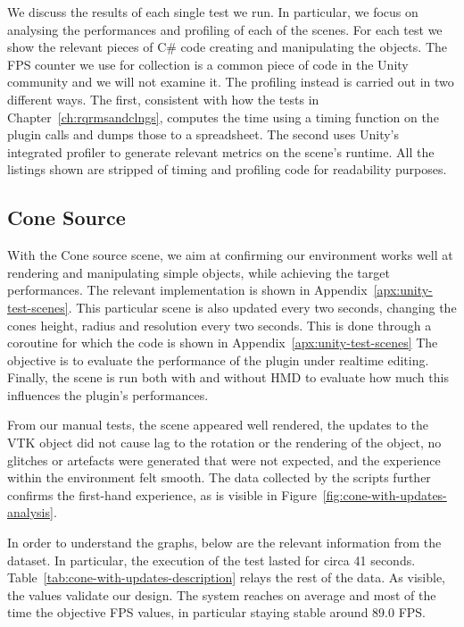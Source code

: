 We discuss the results of each single test we run. In particular, we focus on analysing the performances and profiling of each of the scenes. For each test we show the relevant pieces of C\# code creating and manipulating the objects. The FPS counter we use for collection is a common piece of code in the Unity community and we will not examine it. The profiling instead is carried out in two different ways. The first, consistent with how the tests in Chapter~\ref{ch:rqrmsandclngs}, computes the time using a timing function on the plugin calls and dumps those to a spreadsheet. The second uses Unity's integrated profiler to generate relevant metrics on the scene's runtime. All the listings shown are stripped of timing and profiling code for readability purposes.

\subsection{Cone Source}

With the Cone source scene, we aim at confirming our environment works well at rendering and manipulating simple objects, while achieving the target performances. The relevant implementation is shown in Appendix~\ref{apx:unity-test-scenes}. This particular scene is also updated every two seconds, changing the cones height, radius and resolution every two seconds. This is done through a coroutine for which the code is shown in Appendix~\ref{apx:unity-test-scenes} The objective is to evaluate the performance of the plugin under realtime editing. Finally, the scene is run both with and without HMD to evaluate how much this influences the plugin's performances.

From our manual tests, the scene appeared well rendered, the updates to the VTK object did not cause lag to the rotation or the rendering of the object, no glitches or artefacts were generated that were not expected, and the experience within the environment felt smooth. The data collected by the scripts further confirms the first-hand experience, as is visible in Figure~\ref{fig:cone-with-updates-analysis}.

In order to understand the graphs, below are the relevant information from the dataset. In particular, the execution of the test lasted for circa 41 seconds. Table~\ref{tab:cone-with-updates-description} relays the rest of the data. As visible, the values validate our design. The system reaches on average and most of the time the objective FPS values, in particular staying stable around 89.0 FPS.

